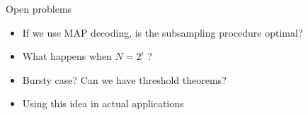 %		
%		
\begin{frame}{Open problems}
\begin{itemize}
  \item If we use MAP decoding, is the subsampling procedure optimal?
  \item What happens when $N=2^i$ ?
  \item Bursty case? Can we have threshold theorems?
  \item Using this idea in actual applications
\end{itemize}
\end{frame}
 